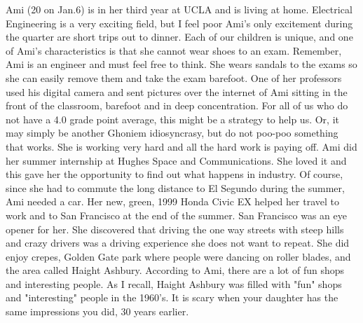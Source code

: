 Ami (20 on Jan.6) is in her third year at UCLA and is living at home.  Electrical Engineering is a very exciting field, but I feel poor Ami's
only excitement during the quarter are short trips out to dinner. Each of our children is unique, and one of Ami's characteristics is that she
cannot wear shoes to an exam. Remember, Ami is an engineer and must feel free to think. She wears sandals to the exams so she can easily remove
them and take the exam barefoot.  One of her professors used his digital camera and sent pictures over the internet of Ami sitting in the front
of the classroom, barefoot and in deep concentration.  For all of us who do not have a 4.0 grade point average, this might be a strategy to help
us.  Or, it may simply be another Ghoniem idiosyncrasy, but do not poo-poo something that works.  She is working very hard and all the hard work
is paying off.  Ami did her summer internship at Hughes Space and Communications.  She loved it and this gave her the opportunity to find out
what happens in industry.  Of course, since she had to commute the long distance to El Segundo during the summer, Ami needed a car.  Her new,
green, 1999 Honda Civic EX helped her travel to work and to San Francisco at the end of the summer.  San Francisco was an eye opener for her.
She discovered that driving the one way streets with steep hills and crazy drivers was a driving experience she does not want to repeat.  She
did enjoy crepes, Golden Gate park where people were dancing on roller blades, and the area called Haight Ashbury.  According to Ami, there are
a lot of fun shops and interesting people.  As I recall, Haight Ashbury  was filled with "fun" shops and "interesting" people in the 1960's.  It
is scary when your daughter has the same impressions you did, 30 years earlier.


